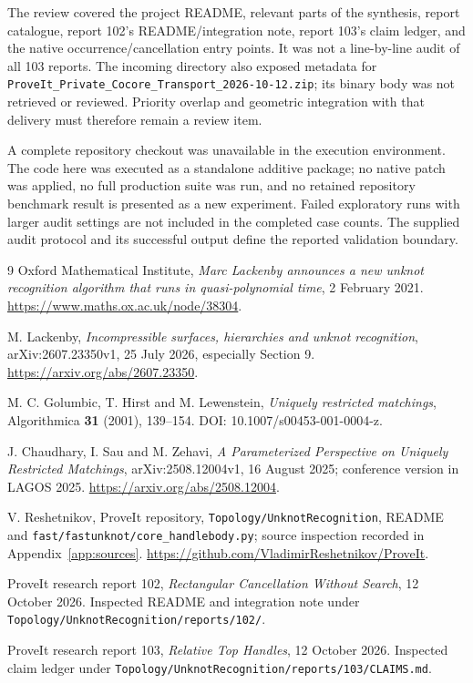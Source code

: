 \documentclass[11pt,a4paper]{article}
\theoremstyle{definition}
\theoremstyle{remark}
\newcommand{\code}[1]{\nolinkurl{#1}}
\begin{document}
The review covered the project README, relevant parts of the synthesis,
report catalogue, report 102's README/integration note, report 103's claim
ledger, and the native occurrence/cancellation entry points. It was not a
line-by-line audit of all 103 reports. The incoming directory also exposed
metadata for \code{ProveIt_Private_Cocore_Transport_2026-10-12.zip}; its
binary body was not retrieved or reviewed. Priority overlap and geometric
integration with that delivery must therefore remain a review item.

A complete repository checkout was unavailable in the execution environment.
The code here was executed as a standalone additive package; no native
patch was applied, no full production suite was run, and no retained
repository benchmark result is presented as a new experiment. Failed
exploratory runs with larger audit settings are not included in the
completed case counts. The supplied audit protocol and its successful
output define the reported validation boundary.

\clearpage
\begin{thebibliography}{9}
Oxford Mathematical Institute, \emph{Marc Lackenby announces a new unknot
recognition algorithm that runs in quasi-polynomial time}, 2 February 2021.
\url{https://www.maths.ox.ac.uk/node/38304}.

M. Lackenby, \emph{Incompressible surfaces, hierarchies and unknot
recognition}, arXiv:2607.23350v1, 25 July 2026, especially Section 9.
\url{https://arxiv.org/abs/2607.23350}.

M. C. Golumbic, T. Hirst and M. Lewenstein,
\emph{Uniquely restricted matchings}, Algorithmica \textbf{31} (2001),
139--154. DOI: 10.1007/s00453-001-0004-z.

J. Chaudhary, I. Sau and M. Zehavi,
\emph{A Parameterized Perspective on Uniquely Restricted Matchings},
arXiv:2508.12004v1, 16 August 2025; conference version in LAGOS 2025.
\url{https://arxiv.org/abs/2508.12004}.

V. Reshetnikov, ProveIt repository, \code{Topology/UnknotRecognition},
README and \code{fast/fastunknot/core_handlebody.py}; source inspection
recorded in Appendix~\ref{app:sources}.
\url{https://github.com/VladimirReshetnikov/ProveIt}.

ProveIt research report 102, \emph{Rectangular Cancellation Without Search},
12 October 2026. Inspected README and integration note under
\code{Topology/UnknotRecognition/reports/102/}.

ProveIt research report 103, \emph{Relative Top Handles}, 12 October 2026.
Inspected claim ledger under
\code{Topology/UnknotRecognition/reports/103/CLAIMS.md}.
\end{thebibliography}
\end{document}
